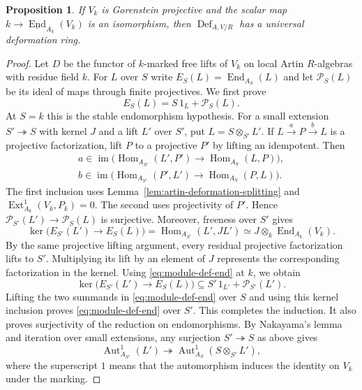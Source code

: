 \documentclass[12pt,a4paper,english,reqno]{amsart}
\numberwithin{equation}{section}
\theoremstyle{plain}
\newtheorem{proposition}[theorem]{Proposition}
\theoremstyle{definition}
\begin{document}
\begin{proposition}\label{prop:artin-module-deformation-universal}
If $V_k$ is Gorenstein projective and the scalar map
$k\to\underline{\operatorname{End}}_{A_k}(V_k)$ is an
isomorphism, then $\operatorname{Def}_{A,V/R}$ has a universal
deformation ring.
\end{proposition}

\begin{proof}
Let $D$ be the functor of $k$-marked free lifts of $V_k$ on
local Artin $R$-algebras with residue field $k$. For $L$ over
$S$ write $E_S(L)=\operatorname{End}_{A_S}(L)$ and let
$\mathcal P_S(L)$ be its ideal of maps through finite projectives.
We first prove
\begin{equation}\label{eq:module-def-end}
 E_S(L)=S\,1_L+\mathcal P_S(L).
\end{equation}
At $S=k$ this is the stable endomorphism hypothesis. For a small
extension $S'\twoheadrightarrow S$ with kernel $J$ and a lift $L'$
over $S'$, put $L=S\otimes_{S'}L'$. If
$L\xrightarrow{a}P\xrightarrow{b}L$ is a projective factorization,
lift $P$ to a projective $P'$ by lifting an idempotent. Then
\[
\begin{gathered}
 a\in\operatorname{im}\bigl(
 \operatorname{Hom}_{A_{S'}}(L',P')\to
 \operatorname{Hom}_{A_S}(L,P)\bigr),\\
 b\in\operatorname{im}\bigl(
 \operatorname{Hom}_{A_{S'}}(P',L')\to
 \operatorname{Hom}_{A_S}(P,L)\bigr).
\end{gathered}
\]
The first inclusion uses Lemma~\ref{lem:artin-deformation-splitting}
and $\operatorname{Ext}^1_{A_k}(V_k,P_k)=0$. The second uses
projectivity of $P'$. Hence $\mathcal P_{S'}(L')\to\mathcal P_S(L)$
is surjective. Moreover, freeness over $S'$ gives
\[
 \ker\bigl(E_{S'}(L')\to E_S(L)\bigr)
  =\operatorname{Hom}_{A_{S'}}(L',JL')
  \simeq J\otimes_k\operatorname{End}_{A_k}(V_k).
\]
By the same projective lifting argument, every residual projective
factorization lifts to $S'$. Multiplying its lift by an element of
$J$ represents the corresponding factorization in the kernel.
Using \eqref{eq:module-def-end} at $k$, we obtain
\[
 \ker\bigl(E_{S'}(L')\to E_S(L)\bigr)
       \subseteq S'\,1_{L'}+\mathcal P_{S'}(L').
\]
Lifting the two summands in \eqref{eq:module-def-end} over $S$
and using this kernel inclusion proves \eqref{eq:module-def-end}
over $S'$. This completes the induction. It also proves surjectivity
of the reduction on endomorphisms. By Nakayama's lemma and iteration
over small extensions, any surjection $S'\twoheadrightarrow S$
as above gives
\begin{equation}\label{eq:module-def-aut-lift}
 \operatorname{Aut}^{1}_{A_{S'}}(L')
 \twoheadrightarrow \operatorname{Aut}^{1}_{A_S}(S\otimes_{S'}L'),
\end{equation}
where the superscript $1$ means that the automorphism induces the
identity on $V_k$ under the marking.


\end{proof}
\end{document}
